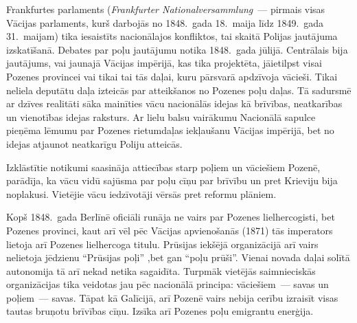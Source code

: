 \documentclass[twoside,a5paper,12pt,fleqn,openany]{extbook}
\newcommand{\detxti}[1]{\textit{\textgerman{#1}}}
\begin{document}
Frankfurtes parlaments (\detxti{Frankfurter Nationalversammlung}~--- pirmais visas Vācijas parlaments, kurš darbojās no 1848.~gada 18.~maija līdz 1849.~gada 31.~maijam) tika iesaistīts nacionālajos konfliktos, tai skaitā Polijas jautājuma izskatīšanā. Debates par poļu jautājumu notika 1848.~gada jūlijā. Centrālais bija jautājums, vai jaunajā Vācijas impērijā, kas tika projektēta, jāietilpst visai Pozenes provincei vai tikai tai tās daļai, kuru pārsvarā apdzīvoja vācieši. Tikai neliela deputātu daļa izteicās par atteikšanos no Pozenes poļu daļas. Tā sadursmē ar dzīves realitāti sāka mainīties vācu nacionālās idejas kā brīvības, neatkarības un vienotības idejas raksturs. Ar lielu balsu vairākumu Nacionālā sapulce pieņēma lēmumu par Pozenes rietumdaļas iekļaušanu Vācijas impērijā, bet no idejas atjaunot neatkarīgu Poliju atteicās.

Izklāstītie notikumi saasināja attiecības starp poļiem un vāciešiem Pozenē, parādīja, ka vācu vidū sajūsma par poļu cīņu par brīvību un pret Krieviju bija noplakusi. Vietējie vācu iedzīvotāji vērsās pret reformu plāniem.

Kopš 1848.~gada Berlīnē oficiāli runāja ne vairs par Pozenes lielhercogisti, bet Pozenes provinci, kaut arī vēl pēc Vācijas apvienošanās (1871) tās imperators lietoja arī Pozenes lielhercoga titulu. Prūsijas iekšējā organizācijā arī vairs nelietoja jēdzienu ``Prūsijas poļi'' ,bet gan ``poļu prūši''. Vienai novada daļai solītā autonomija tā arī nekad netika sagaidīta. Turpmāk vietējās saimnieciskās organizācijas tika veidotas jau pēc nacionālā principa: vāciešiem~--- savas un poļiem~--- savas. Tāpat kā Galīcijā, arī Pozenē vairs nebija cerību izraisīt visas tautas bruņotu brīvības cīņu. Izsīka arī Pozenes poļu emigrantu enerģija.
\end{document}

